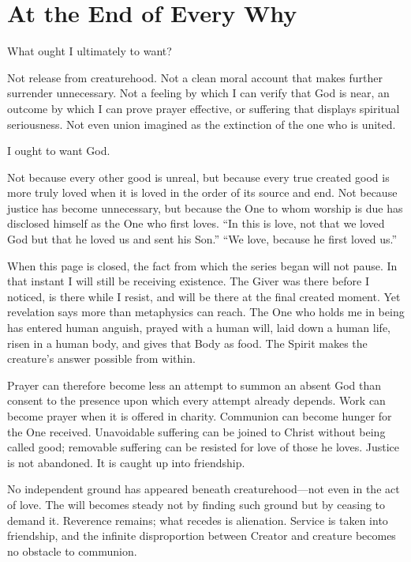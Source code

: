 \section{At the End of Every Why}

What ought I ultimately to want?

Not release from creaturehood. Not a clean moral account that makes further surrender unnecessary. Not a feeling by which I can verify that God is near, an outcome by which I can prove prayer effective, or suffering that displays spiritual seriousness. Not even union imagined as the extinction of the one who is united.

I ought to want God.

Not because every other good is unreal, but because every true created good is more truly loved when it is loved in the order of its source and end. Not because justice has become unnecessary, but because the One to whom worship is due has disclosed himself as the One who first loves. ``In this is love, not that we loved God but that he loved us and sent his Son.'' ``We love, because he first loved us.''

When this page is closed, the fact from which the series began will not pause. In that instant I will still be receiving existence. The Giver was there before I noticed, is there while I resist, and will be there at the final created moment. Yet revelation says more than metaphysics can reach. The One who holds me in being has entered human anguish, prayed with a human will, laid down a human life, risen in a human body, and gives that Body as food. The Spirit makes the creature's answer possible from within.

Prayer can therefore become less an attempt to summon an absent God than consent to the presence upon which every attempt already depends. Work can become prayer when it is offered in charity. Communion can become hunger for the One received. Unavoidable suffering can be joined to Christ without being called good; removable suffering can be resisted for love of those he loves. Justice is not abandoned. It is caught up into friendship.

No independent ground has appeared beneath creaturehood---not even in the act of love. The will becomes steady not by finding such ground but by ceasing to demand it. Reverence remains; what recedes is alienation. Service is taken into friendship, and the infinite disproportion between Creator and creature becomes no obstacle to communion.

